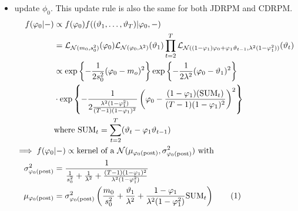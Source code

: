 \documentclass[12pt,	%
	a4paper,		%
	twoside,		%
	openright,		%
	titlepage,%
	]{book}
\theoremstyle{definition}
\begin{document}
\begin{itemize}
\item update $\phi_0$. This update rule is also the same for both JDRPM and CDRPM.
\begin{align*}
        f(\phi_0|-) &\propto f(\phi_0) f((\theta_1,\ldots,\theta_T)|\phi_0,-) \\
        &= \law_{\N(m_0,s^2_0)}(\phi_0) \law_{\N(\phi_0,\lambda^2)}(\theta_1) \prod_{t=2}^T \L_{\N((1-\phi_1)\phi_0 + \phi_1\theta_{t-1},\lambda^2(1-\phi_1^2))}(\theta_t)\\
        &\propto \expp{-\frac{1}{2s_0^2}(\phi_0-m_o)^2}\expp{-\frac{1}{2\lambda^2}(\phi_0-\theta_1)^2}\\
        & \cdot \expp{-\frac{1}{2\frac{\lambda^2(1-\phi_1^2)}{(T-1)(1-\phi_1)^2}}\left(\phi_0-\frac{(1-\phi_1)(\text{SUM}_t)}{(T-1)(1-\phi_1)^2}\right)^2}\\& \text{where SUM}_t = \sum_{t=2}^T(\theta_t-\phi_1\theta_{t-1})\\
    \implies f(\phi_0&|-) \propto \text{kernel of a $\N(\mu_{\phi_0\post},\sigma^{2}_{\phi_0\post})$ with}\\
    \sigma^{2}_{\postp{\phi_0}} &= \dfrac{1}{\frac{1}{s_0^2}+\frac{1}{\lambda^2}+\frac{(T-1)(1-\phi_1)^2}{\lambda^2(1-\phi_1^2)}}\\
    \mu_{\phi_0\post} &= \sigma^{2}_{\phi_0\post} \left(\dfrac{m_0}{s_0^2}+\dfrac{\theta_1}{\lambda^2}+\dfrac{1-\phi_1}{\lambda^2(1-\phi_1^2)}\text{SUM}_t\right)
\tag{\stepcounter{equation}\theequation}
\end{align*}


\end{itemize}
\end{document}
